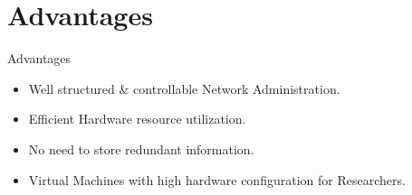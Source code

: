 \documentclass[xcolor=dvipsnames]{beamer}
\begin{document}
\section{Advantages}
\begin{frame}{Advantages}
\begin{itemize}
	\item Well structured \& controllable Network Administration.
	\item Efficient Hardware resource utilization.
	\item No need to store redundant information.
	\item Virtual Machines with high hardware configuration for Researchers.
\end{itemize}
\end{frame}

%	
%
%
\end{document}
